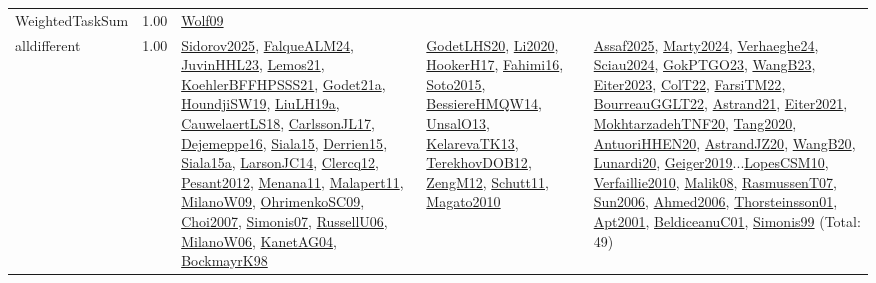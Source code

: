 {\begin{longtable}{p{3cm}r>{\raggedright\arraybackslash}p{6cm}>{\raggedright\arraybackslash}p{6cm}>{\raggedright\arraybackslash}p{8cm}}
\index{WeightedTaskSum}\index{Constraints!WeightedTaskSum}WeightedTaskSum &  1.00 & \hyperref[detail:Wolf09]{Wolf09} &  & \\
\index{alldifferent}\index{Constraints!alldifferent}alldifferent &  1.00 & \hyperref[detail:Sidorov2025]{Sidorov2025}, \hyperref[detail:FalqueALM24]{FalqueALM24}, \hyperref[detail:JuvinHHL23]{JuvinHHL23}, \hyperref[detail:Lemos21]{Lemos21}, \hyperref[detail:KoehlerBFFHPSSS21]{KoehlerBFFHPSSS21}, \hyperref[detail:Godet21a]{Godet21a}, \hyperref[detail:HoundjiSW19]{HoundjiSW19}, \hyperref[detail:LiuLH19a]{LiuLH19a}, \hyperref[detail:CauwelaertLS18]{CauwelaertLS18}, \hyperref[detail:CarlssonJL17]{CarlssonJL17}, \hyperref[detail:Dejemeppe16]{Dejemeppe16}, \hyperref[detail:Siala15]{Siala15}, \hyperref[detail:Derrien15]{Derrien15}, \hyperref[detail:Siala15a]{Siala15a}, \hyperref[detail:LarsonJC14]{LarsonJC14}, \hyperref[detail:Clercq12]{Clercq12}, \hyperref[detail:Pesant2012]{Pesant2012}, \hyperref[detail:Menana11]{Menana11}, \hyperref[detail:Malapert11]{Malapert11}, \hyperref[detail:MilanoW09]{MilanoW09}, \hyperref[detail:OhrimenkoSC09]{OhrimenkoSC09}, \hyperref[detail:Choi2007]{Choi2007}, \hyperref[detail:Simonis07]{Simonis07}, \hyperref[detail:RussellU06]{RussellU06}, \hyperref[detail:MilanoW06]{MilanoW06}, \hyperref[detail:KanetAG04]{KanetAG04}, \hyperref[detail:BockmayrK98]{BockmayrK98} & \hyperref[detail:GodetLHS20]{GodetLHS20}, \hyperref[detail:Li2020]{Li2020}, \hyperref[detail:HookerH17]{HookerH17}, \hyperref[detail:Fahimi16]{Fahimi16}, \hyperref[detail:Soto2015]{Soto2015}, \hyperref[detail:BessiereHMQW14]{BessiereHMQW14}, \hyperref[detail:UnsalO13]{UnsalO13}, \hyperref[detail:KelarevaTK13]{KelarevaTK13}, \hyperref[detail:TerekhovDOB12]{TerekhovDOB12}, \hyperref[detail:ZengM12]{ZengM12}, \hyperref[detail:Schutt11]{Schutt11}, \hyperref[detail:Magato2010]{Magato2010} & \hyperref[detail:Assaf2025]{Assaf2025}, \hyperref[detail:Marty2024]{Marty2024}, \hyperref[detail:Verhaeghe24]{Verhaeghe24}, \hyperref[detail:Sciau2024]{Sciau2024}, \hyperref[detail:GokPTGO23]{GokPTGO23}, \hyperref[detail:WangB23]{WangB23}, \hyperref[detail:Eiter2023]{Eiter2023}, \hyperref[detail:ColT22]{ColT22}, \hyperref[detail:FarsiTM22]{FarsiTM22}, \hyperref[detail:BourreauGGLT22]{BourreauGGLT22}, \hyperref[detail:Astrand21]{Astrand21}, \hyperref[detail:Eiter2021]{Eiter2021}, \hyperref[detail:MokhtarzadehTNF20]{MokhtarzadehTNF20}, \hyperref[detail:Tang2020]{Tang2020}, \hyperref[detail:AntuoriHHEN20]{AntuoriHHEN20}, \hyperref[detail:AstrandJZ20]{AstrandJZ20}, \hyperref[detail:WangB20]{WangB20}, \hyperref[detail:Lunardi20]{Lunardi20}, \hyperref[detail:Geiger2019]{Geiger2019}...\hyperref[detail:LopesCSM10]{LopesCSM10}, \hyperref[detail:Verfaillie2010]{Verfaillie2010}, \hyperref[detail:Malik08]{Malik08}, \hyperref[detail:RasmussenT07]{RasmussenT07}, \hyperref[detail:Sun2006]{Sun2006}, \hyperref[detail:Ahmed2006]{Ahmed2006}, \hyperref[detail:Thorsteinsson01]{Thorsteinsson01}, \hyperref[detail:Apt2001]{Apt2001}, \hyperref[detail:BeldiceanuC01]{BeldiceanuC01}, \hyperref[detail:Simonis99]{Simonis99} (Total: 49)\\

\end{longtable}}
